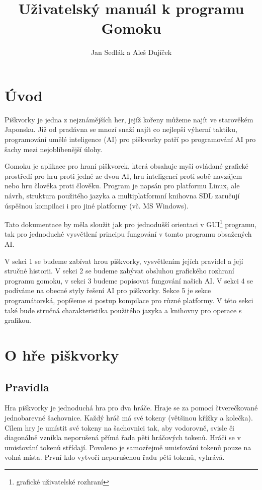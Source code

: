\documentclass[a4paper,11pt,titlepage]{article}
\author{Jan Sedlák a Aleš Dujíček}
\title{Uživatelský manuál k programu Gomoku}
\begin{document}
\maketitle
\tableofcontents
\newpage
\section{Úvod}
Piškvorky je jedna z nejznámějších her, jejíž kořeny můžeme najít ve starověkém Japonsku. Již od pradávna se mnozí snaží najít co nejlepší výherní taktiku, programování umělé inteligence (AI) pro piškvorky patří po programování AI pro šachy mezi nejoblíbenější úlohy. 

Gomoku je aplikace pro hraní piškvorek, která obsahuje myší ovládané grafické prostředí pro hru proti jedné ze dvou AI, hru inteligencí proti sobě navzájem nebo hru člověka proti člověku. Program je napsán pro platformu Linux, ale návrh, struktura použitého jazyka a multiplatformní knihovna SDL zaručují úspěšnou kompilaci i pro jiné platformy (vč. MS Windows).

Tato dokumentace by měla sloužit jak pro jednodušší orientaci v GUI\footnote{grafické uživatelské rozhraní} programu, tak pro jednoduché vysvětlení principu fungování v tomto programu obsažených AI.

V sekci 1 se budeme zabívat hrou piškvorky, vysvětlením jejích pravidel a její stručné historii. V sekci 2 se budeme zabývat obsluhou grafického rozhraní programu gomoku, v sekci 3 budeme popisovat fungování našich AI. V sekci 4 se podíváme na obecné styly řešení AI pro piškvorky. Sekce 5 je sekce programátorská, popíšeme si postup kompilace pro různé platformy. V této sekci také bude stručná charakteristika použitého jazyka a knihovny pro operace s grafikou.
\newpage
\section{O hře piškvorky}
\subsection{Pravidla}
Hra piškvorky je jednoduchá hra pro dva hráče. Hraje se za pomocí čtve\-reč\-ko\-va\-né jednobarevné šachovnice. Každý hráč má své tokeny (většinou křížky a kolečka). Cílem hry je umístit své tokeny na šachovnici tak, aby vodorovně, svisle či diagonálně vznikla neporušená přímá řada pěti hráčových tokenů. Hráči se v umisťování tokenů střídají. Povoleno je samozřejmě umisťování tokenů pouze na volná místa. První kdo vytvoří neporušenou řadu pěti tokenů, vyhrává. 
\end{document}
